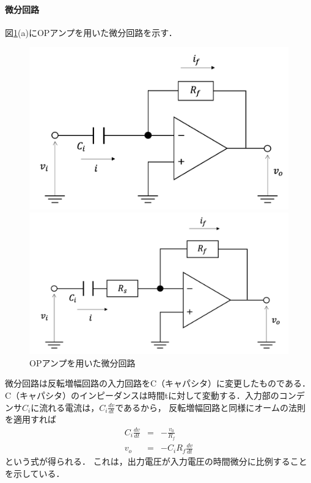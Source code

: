 \documentclass[dvipdfmx,titlepage,a4j]{jsarticle}  %
\begin{document}
\paragraph{微分回路\\}
図\ref{fig:di:case2}(a)にOPアンプを用いた微分回路を示す．
\begin{figure}[H]
  \centering
  \begin{minipage}{8cm}
    \centering
    \includegraphics[keepaspectratio, scale=0.2]{../image/di-case21.png}
  \end{minipage}
  \begin{minipage}{8cm}
    \centering
    \includegraphics[keepaspectratio, scale=0.2]{../image/di-case22.png}
  \end{minipage}
  \caption{OPアンプを用いた微分回路}
  \label{fig:di:case2}
\end{figure}

微分回路は反転増幅回路の入力回路をC（キャパシタ）に変更したものである．
C（キャパシタ）のインピーダンスは時間tに対して変動する．入力部のコンデンサ$C_i$に流れる電流は，$C_i\frac{dv}{dt}$であるから，
反転増幅回路と同様にオームの法則を適用すれば
\begin{eqnarray}
  C_i\frac{dv}{dt} &=& -\frac{v_0}{R_f}\\
  v_{o} &=& -C_i R_f\frac{dv}{dt}
\end{eqnarray}
という式が得られる．
これは，出力電圧が入力電圧の時間微分に比例することを示している．
\end{document}
